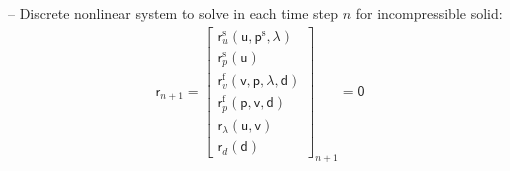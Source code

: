\documentclass[a4paper,12pt]{report}
\newcommand{\bs}[1]{\boldsymbol{#1}}
\newcommand{\ROP}{\bs{\mathsf{r}}}
\newcommand{\LM}{\bs{\mathsf{\lambda}}}
\begin{document}
-- Discrete nonlinear system to solve in each time step $n$ for incompressible solid:
\begin{equation}
\label{equation-nonlin-sys-fsi-inc}
\begin{aligned}
\ROP_{n+1} = \begin{bmatrix} \ROP_{u}^{\mathrm{s}}(\bs{\mathsf{u}},\bs{\mathsf{p}}^{\mathrm{s}},\LM) \\ \ROP_{p}^{\mathrm{s}}(\bs{\mathsf{u}}) \\ \ROP_{v}^{\mathrm{f}}(\bs{\mathsf{v}},\bs{\mathsf{p}},\LM,\bs{\mathsf{d}}) \\ \ROP_{p}^{\mathrm{f}}(\bs{\mathsf{p}},\bs{\mathsf{v}},\bs{\mathsf{d}}) \\ \ROP_{\lambda}(\bs{\mathsf{u}},\bs{\mathsf{v}}) \\ \ROP_{d}(\bs{\mathsf{d}}) \end{bmatrix}_{n+1} = \bs{\mathsf{0}}
\end{aligned}
\end{equation}
\end{document}
